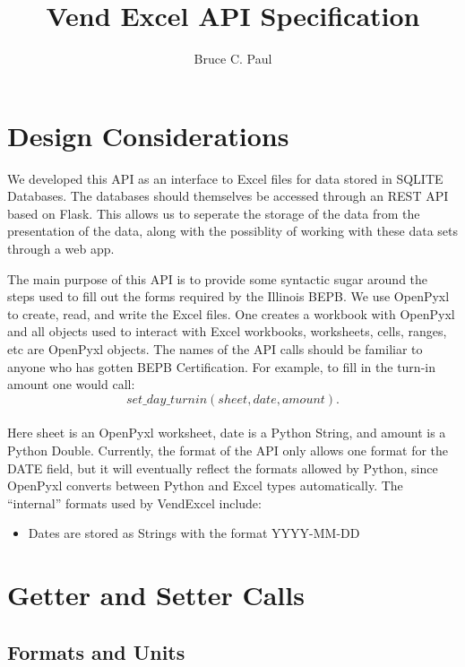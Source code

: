 \documentclass[12pt]{article}
\begin{document}
\title{Vend Excel API Specification}
\author{Bruce C. Paul}
\maketitle

\section{Design Considerations}

We developed this API as an interface to Excel files for data stored
in SQLITE Databases.  The databases should themselves be accessed
through an REST API based on Flask.  This allows us to seperate the
storage of the data from the presentation of the data, along with the
possiblity of working with these data sets through a web app.

The main purpose of this API is to provide some syntactic sugar around
the steps used to fill out the forms required by the Illinois BEPB.
We use OpenPyxl to create, read, and write the Excel files.  One
creates a workbook with OpenPyxl and all objects used to interact with
Excel workbooks, worksheets, cells, ranges, etc are OpenPyxl objects.
The names of the API calls should be familiar to anyone who has gotten
BEPB Certification.  For example, to fill in the turn-in amount one 
would call: \\

\[ 
set\_day\_turnin(sheet, date, amount) .
\] \\

\noindent Here sheet is an OpenPyxl worksheet, date is a Python
String, and amount is a Python Double.  Currently, the format of the
API only allows one format for the DATE field, but it will eventually
reflect the formats allowed by Python, since OpenPyxl converts between
Python and Excel types automatically.  The ``internal'' formats used
by VendExcel include:

\begin{itemize}
\item{Dates are stored as Strings with the format YYYY-MM-DD}
\end{itemize}

\section{Getter and Setter Calls}

\subsection{Formats and Units}
\end{document}
